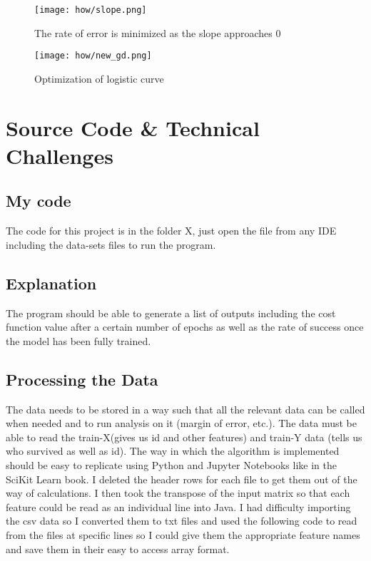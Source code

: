\documentclass[notitlepage,a4paper,oneside,article,table]{article}
\begin{document}
\begin{enumerate}
    \begin{figure}[h] %
    \centering
    \texttt{[image: how/slope.png]}
    \caption{The rate of error is minimized as the slope approaches $0$}
\end{figure}
\FloatBarrier

    \begin{figure}[h] %
    \centering
    \texttt{[image: how/new\_gd.png]}
    \caption{Optimization of logistic curve}
\end{figure}
\FloatBarrier
    
\end{enumerate}


\section{Source Code \& Technical Challenges}
\subsection{My code}
The code for this project is in the folder X, just open the file from any IDE including the data-sets files to run the program. 



\subsection{Explanation}
The program should be able to generate a list of outputs including the cost function value after a certain number of epochs as well as the rate of success once the model has been fully trained.

\subsection{Processing the Data}
The data needs to be stored in a way such that all the relevant data can be called when needed and to 
run analysis on it (margin of error, etc.). The data must be able to read the train-X(gives us id and other features) and train-Y data (tells us who survived as well as id). The way in which the algorithm is implemented should be easy to replicate using Python and Jupyter Notebooks like in the SciKit Learn book. I deleted the header rows for each file to get them out of the way of calculations. I then took the transpose of the input matrix so that each feature could be read as an individual line into Java. I had difficulty importing the csv data so I converted them to txt files and used the following code to read from the files at specific lines so I could give them the appropriate feature names and save them in their easy to access array format.
\end{document}
